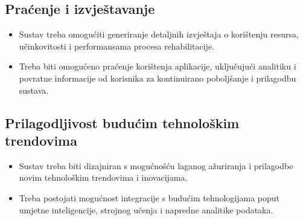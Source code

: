 \documentclass[12pt]{report}
\begin{document}
\subsection*{Praćenje i izvještavanje}
\begin{itemize}
    \item Sustav treba omogućiti generiranje detaljnih izvještaja o korištenju resursa, učinkovitosti i performansama procesa rehabilitacije.
    \item Treba biti omogućeno praćenje korištenja aplikacije, uključujući analitiku i povratne informacije od korisnika za kontinuirano poboljšanje i prilagodbu sustava.
\end{itemize}

\subsection*{Prilagodljivost budućim tehnološkim trendovima}
\begin{itemize}
    \item Sustav treba biti dizajniran s mogućnošću laganog ažuriranja i prilagodbe novim tehnološkim trendovima i inovacijama.
    \item Treba postojati mogućnost integracije s budućim tehnologijama poput umjetne inteligencije, strojnog učenja i napredne analitike podataka.
\end{itemize}


\eject
\end{document}
